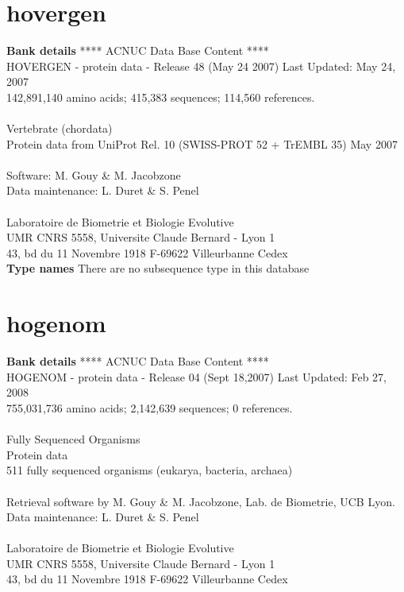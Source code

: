 \documentclass{article}
\begin{document}
\begin{Schunk}
\section{ hovergen }
\textbf{Bank details}
               ****     ACNUC Data Base Content      ****                       \\
 HOVERGEN - protein data - Release 48 (May 24 2007) Last Updated: May 24, 2007\\
          142,891,140 amino acids; 415,383 sequences; 114,560 references.\\
\\
                       Vertebrate (chordata)	  \\
    Protein data from UniProt Rel. 10 (SWISS-PROT 52 + TrEMBL 35) May 2007\\
\\
Software: M. Gouy \& M. Jacobzone\\
Data maintenance: L. Duret \& S. Penel\\
\\
Laboratoire de Biometrie et Biologie Evolutive\\
UMR CNRS 5558, Universite Claude Bernard - Lyon 1 \\
43, bd du 11 Novembre 1918 F-69622 Villeurbanne Cedex\\


\textbf{Type names}
There are no subsequence type in this database
\section{ hogenom }
\textbf{Bank details}
               ****     ACNUC Data Base Content      ****                      \\
 HOGENOM - protein data - Release 04 (Sept 18,2007) Last Updated: Feb 27, 2008\\
          755,031,736 amino acids; 2,142,639 sequences; 0 references.\\
                                                                               \\
                        Fully Sequenced Organisms\\
   				Protein data \\
	  511 fully sequenced organisms (eukarya, bacteria, archaea)\\
\\
Retrieval software by M. Gouy \& M. Jacobzone, Lab. de Biometrie, UCB Lyon.\\
Data maintenance: L. Duret \& S. Penel\\
\\
Laboratoire de Biometrie et Biologie Evolutive\\
UMR CNRS 5558, Universite Claude Bernard - Lyon 1 \\
43, bd du 11 Novembre 1918 F-69622 Villeurbanne Cedex\\



\end{Schunk}
\end{document}
